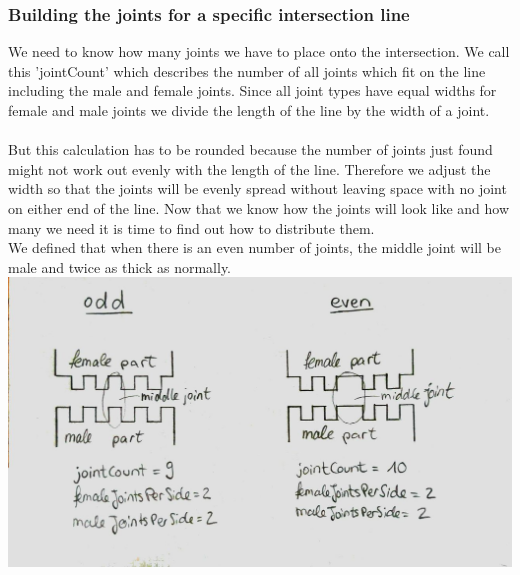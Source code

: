 \documentclass[../ClassicThesis.tex]{subfiles}
\begin{document}
\subsubsection{Building the joints for a specific intersection line}
We need to know how many joints we have to place onto the intersection. We call this 'jointCount' which describes the number of all joints which fit on the line including the male and female joints. Since all joint types have equal widths for female and male joints we divide the length of the line by the width of a joint.\\
\*\\
But this calculation has to be rounded because the number of joints just found might not work out evenly with the length of the line. Therefore we adjust the width so that the joints will be evenly spread without leaving space with no joint on either end of the line.
Now that we know how the joints will look like and how many we need it is time to find out how to distribute them.\\
We defined that when there is an even number of joints, the middle joint will be male and twice as thick as normally.\\
\includegraphics[width=\columnwidth]{Images/10-joints-evenOddJointCount.jpg}\\
\*\\
\end{document}
